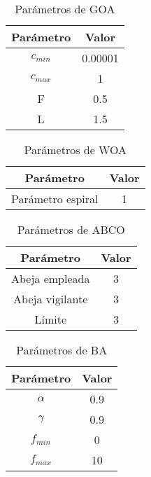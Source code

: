\begin{table}[H]
    \centering
    \begin{tabular}{ c c }
        \hline
        \textbf{Parámetro} & \textbf{Valor} \\
        \hline
        $c_{min}$          & 0.00001        \\
        $c_{max}$          & 1              \\
        F                  & 0.5            \\
        L                  & 1.5            \\
        \hline
    \end{tabular}
    \caption{Parámetros de GOA}
\end{table}

\begin{table}[H]
    \centering
    \begin{tabular}{ c c }
        \hline
        \textbf{Parámetro} & \textbf{Valor} \\
        \hline
        Parámetro espiral  & 1              \\
        \hline
    \end{tabular}
    \caption{Parámetros de WOA}
\end{table}

\begin{table}[H]
    \centering
    \begin{tabular}{ c c }
        \hline
        \textbf{Parámetro} & \textbf{Valor} \\
        \hline
        Abeja empleada     & 3              \\
        Abeja vigilante    & 3              \\
        Límite             & 3              \\
        \hline
    \end{tabular}
    \caption{Parámetros de ABCO}
\end{table}

\begin{table}[H]
    \centering
    \begin{tabular}{ c c }
        \hline
        \textbf{Parámetro} & \textbf{Valor} \\
        \hline
        $\alpha$           & 0.9            \\
        $\gamma $          & 0.9            \\
        $f_{min}$          & 0              \\
        $f_{max}$          & 10             \\
        \hline
    \end{tabular}
    \caption{Parámetros de BA}
\end{table}

